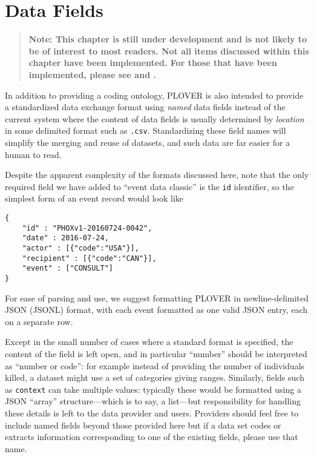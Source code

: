 \documentclass[11pt]{report}
\newcommand{\ti}[1]{\textit{#1}}
\newcommand{\txt}[1]{\texttt{#1}}
\begin{document}
\chapter{Data Fields}

\begin{quote}
\textbf{Note: This chapter is still under development and is not likely to be of interest to most readers. Not all items discussed within this chapter have been implemented. For those that have been implemented, please see \citet{halterman2023creating} and \citet{HaltermanEtAl2023}.}

\end{quote}
\bigskip

In addition to providing a coding ontology, PLOVER is also intended to provide a standardized data exchange format using \ti{named} data fields instead of the current system where the content of data fields is usually determined by \ti{location} in some delimited format such as \txt{.csv}. Standardizing these field names will simplify the merging and reuse of datasets, and such data are far easier for a human to read.

Despite the apparent complexity of the formats discussed here, note that the only required field we have added to ``event data classic'' is the \texttt{id} identifier, so the simplest form of an event record would look like
\begin{verbatim}
{
	"id" : "PHOXv1-20160724-0042",
	"date" : 2016-07-24,
	"actor" : [{"code":"USA"}],
	"recipient" : [{"code":"CAN"}],
	"event" : ["CONSULT"]
}
\end{verbatim}

\noindent For ease of parsing and use, we suggest formatting PLOVER in newline-delimited JSON (JSONL) format, with each event formatted as one valid JSON entry, each on a separate row.

Except in the small number of cases where a standard format is specified, the content of the field is left open, and in particular ``number'' should be interpreted as ``number or code'': for example instead of providing the number of individuals killed, a dataset might use a set of categories giving ranges. Similarly, fields such as \texttt{context} can take multiple values: typically these would be formatted using a JSON ``array'' structure---which is to say, a list---but responsibility for handling these details is left to the data provider and users.  Providers should feel free to include named fields beyond those provided here but if a data set codes or extracts information  corresponding to one of the existing fields, please use that name.
\end{document}
